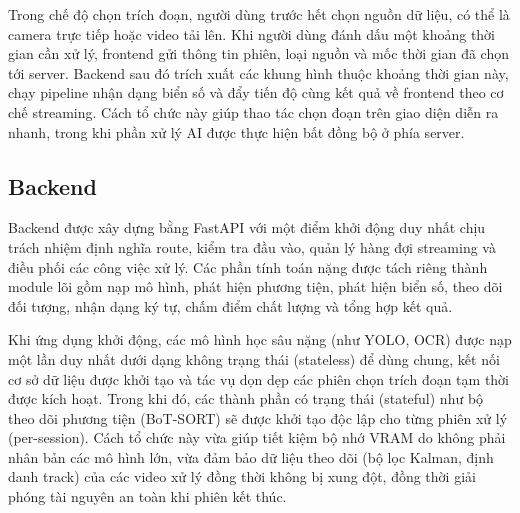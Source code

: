 \documentclass[../DoAn.tex]{subfiles}
\begin{document}
Trong chế độ chọn trích đoạn, người dùng trước hết chọn nguồn dữ liệu, có thể là camera trực tiếp hoặc video tải lên. Khi người dùng đánh dấu một khoảng thời gian cần xử lý, frontend gửi thông tin phiên, loại nguồn và mốc thời gian đã chọn tới server. Backend sau đó trích xuất các khung hình thuộc khoảng thời gian này, chạy pipeline nhận dạng biển số và đẩy tiến độ cùng kết quả về frontend theo cơ chế streaming. Cách tổ chức này giúp thao tác chọn đoạn trên giao diện diễn ra nhanh, trong khi phần xử lý AI được thực hiện bất đồng bộ ở phía server.

\subsection{Backend}
\label{subsection:4.2.6}

Backend được xây dựng bằng FastAPI với một điểm khởi động duy nhất chịu trách nhiệm định nghĩa route, kiểm tra đầu vào, quản lý hàng đợi streaming và điều phối các công việc xử lý. Các phần tính toán nặng được tách riêng thành module lõi gồm nạp mô hình, phát hiện phương tiện, phát hiện biển số, theo dõi đối tượng, nhận dạng ký tự, chấm điểm chất lượng và tổng hợp kết quả.

Khi ứng dụng khởi động, các mô hình học sâu nặng (như YOLO, OCR) được nạp một lần duy nhất dưới dạng không trạng thái (stateless) để dùng chung, kết nối cơ sở dữ liệu được khởi tạo và tác vụ dọn dẹp các phiên chọn trích đoạn tạm thời được kích hoạt. Trong khi đó, các thành phần có trạng thái (stateful) như bộ theo dõi phương tiện (BoT-SORT) sẽ được khởi tạo độc lập cho từng phiên xử lý (per-session). Cách tổ chức này vừa giúp tiết kiệm bộ nhớ VRAM do không phải nhân bản các mô hình lớn, vừa đảm bảo dữ liệu theo dõi (bộ lọc Kalman, định danh track) của các video xử lý đồng thời không bị xung đột, đồng thời giải phóng tài nguyên an toàn khi phiên kết thúc.
\end{document}
